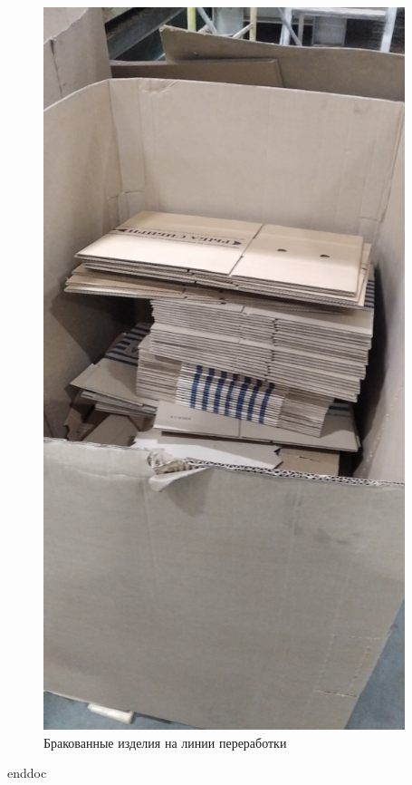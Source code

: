 \begin{figure}
\begin{center}
  \includegraphics[height=0.94\textheight, width=0.94\textwidth, keepaspectratio]{Pics 1/7 Брак на линии.jpg }
\end{center}
  \caption{Бракованные изделия на линии переработки}
  \label{pic:7 Брак на линии}
\end{figure}

\clearpage
 {enddoc}
